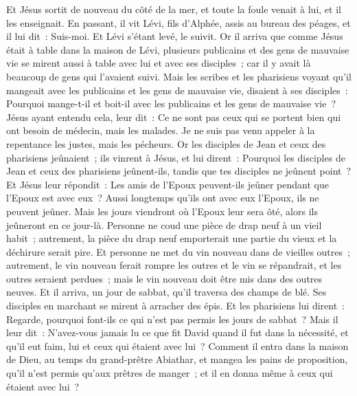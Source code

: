 \begin{multicols}{2}
Et Jésus sortit de nouveau du côté de la mer, et toute la foule venait à lui, et il les enseignait.
En passant, il vit Lévi, fils d'Alphée, assis au bureau des péages, et il lui dit~: Suis-moi. Et Lévi s'étant levé, le suivit.
Or il arriva que comme Jésus était à table dans la maison de Lévi, plusieurs publicains et des gens de mauvaise vie se mirent aussi à table avec lui et avec ses disciples~; car il y avait là beaucoup de gens qui l'avaient suivi.
Mais les scribes et les pharisiens voyant qu'il mangeait avec les publicains et les gens de mauvaise vie, disaient à ses disciples~: Pourquoi mange-t-il et boit-il avec les publicains et les gens de mauvaise vie~?
Jésus ayant entendu cela, leur dit~: Ce ne sont pas ceux qui se portent bien qui ont besoin de médecin, mais les malades. Je ne suis pas venu appeler à la repentance les justes, mais les pécheurs.
Or les disciples de Jean et ceux des pharisiens jeûnaient~; ils vinrent à Jésus, et lui dirent~: Pourquoi les disciples de Jean et ceux des pharisiens jeûnent-ils, tandis que tes disciples ne jeûnent point~?
Et Jésus leur répondit~: Les amis de l'Epoux peuvent-ils jeûner pendant que l'Epoux est avec eux~? Aussi longtemps qu'ils ont avec eux l'Epoux, ils ne peuvent jeûner.
Mais les jours viendront où l'Epoux leur sera ôté, alors ils jeûneront en ce jour-là.
Personne ne coud une pièce de drap neuf à un vieil habit~; autrement, la pièce du drap neuf emporterait une partie du vieux et la déchirure serait pire.
Et personne ne met du vin nouveau dans de vieilles outres~; autrement, le vin nouveau ferait rompre les outres et le vin se répandrait, et les outres seraient perdues~; mais le vin nouveau doit être mis dans des outres neuves.
Et il arriva, un jour de sabbat, qu'il traversa des champs de blé. Ses disciples en marchant se mirent à arracher des épis.
Et les pharisiens lui dirent~: Regarde, pourquoi font-ils ce qui n'est pas permis les jours de sabbat~?
Mais il leur dit~: N'avez-vous jamais lu ce que fit David quand il fut dans la nécessité, et qu'il eut faim, lui et ceux qui étaient avec lui~?
Comment il entra dans la maison de Dieu, au temps du grand-prêtre Abiathar, et mangea les pains de proposition, qu'il n'est permis qu'aux prêtres de manger~; et il en donna même à ceux qui étaient avec lui~?

\end{multicols}
